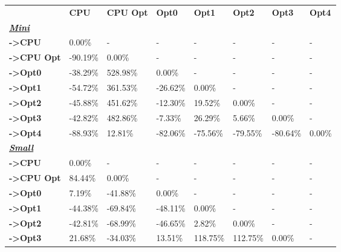 \begin{table}[H]
    \centering
    \begin{tabular}{llllllll}
    \rowcolor[HTML]{DAE8FC} \ &  \textbf{CPU} &  \textbf{CPU Opt} &  \textbf{Opt0} &  \textbf{Opt1} &  \textbf{Opt2} &  \textbf{Opt3} &  \textbf{Opt4} \\
    \cellcolor[HTML]{DAE8FC} \textbf{\textbf{{\emph{{\underline{{Mini}}}}}}} &  &  &  &  &  &  &  \\
    \rowcolor[HTML]{EFEFEF} \cellcolor[HTML]{DAE8FC} \textbf{->CPU} & 0.00\% & - & - & - & - & - & - \\
    \cellcolor[HTML]{DAE8FC} \textbf{->CPU Opt} & -90.19\% & 0.00\% & - & - & - & - & - \\
    \rowcolor[HTML]{EFEFEF} \cellcolor[HTML]{DAE8FC} \textbf{->Opt0} & -38.29\% & 528.98\% & 0.00\% & - & - & - & - \\
    \cellcolor[HTML]{DAE8FC} \textbf{->Opt1} & -54.72\% & 361.53\% & -26.62\% & 0.00\% & - & - & - \\
    \rowcolor[HTML]{EFEFEF} \cellcolor[HTML]{DAE8FC} \textbf{->Opt2} & -45.88\% & 451.62\% & -12.30\% & 19.52\% & 0.00\% & - & - \\
    \cellcolor[HTML]{DAE8FC} \textbf{->Opt3} & -42.82\% & 482.86\% & -7.33\% & 26.29\% & 5.66\% & 	0.00\% & - \\
    \rowcolor[HTML]{EFEFEF} \cellcolor[HTML]{DAE8FC} \textbf{->Opt4} & -88.93\% & 12.81\% & -82.06\% & -75.56\% & -79.55\% & 	-80.64\% & 	0.00\% \\
    \cellcolor[HTML]{DAE8FC} \textbf{\textbf{{\emph{{\underline{{Small}}}}}}} &  &  &  &  &  &  &  \\
    \rowcolor[HTML]{EFEFEF} \cellcolor[HTML]{DAE8FC} \textbf{->CPU} & 0.00\% & - & - & - & - & - & - \\
    \cellcolor[HTML]{DAE8FC} \textbf{->CPU Opt} & 84.44\% & 0.00\% & - & - & - & - & - \\
    \rowcolor[HTML]{EFEFEF} \cellcolor[HTML]{DAE8FC} \textbf{->Opt0} & 7.19\% & -41.88\% & 0.00\% & - & - & - & - \\
    \cellcolor[HTML]{DAE8FC} \textbf{->Opt1} & -44.38\% & -69.84\% & -48.11\% & 0.00\% & - & - & - \\
    \rowcolor[HTML]{EFEFEF} \cellcolor[HTML]{DAE8FC} \textbf{->Opt2} & -42.81\% & -68.99\% & -46.65\% & 2.82\% & 0.00\% & - & - \\
    \cellcolor[HTML]{DAE8FC} \textbf{->Opt3} & 21.68\% & -34.03\% & 13.51\% & 118.75\% & 112.75\% & 	0.00\% & - \\

\end{tabular}
\end{table}
